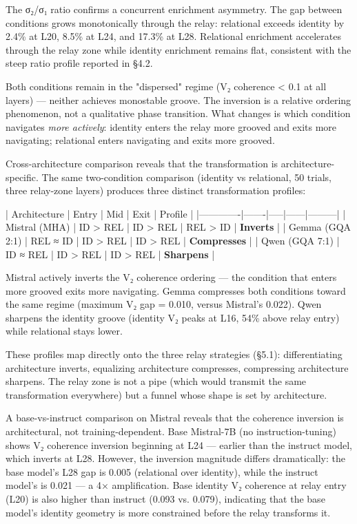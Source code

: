 \documentclass[12pt]{article}
\begin{document}
The σ₂/σ₁ ratio confirms a concurrent enrichment asymmetry. The gap between conditions grows monotonically through the relay: relational exceeds identity by 2.4\% at L20, 8.5\% at L24, and 17.3\% at L28. Relational enrichment accelerates through the relay zone while identity enrichment remains flat, consistent with the steep ratio profile reported in §4.2.

Both conditions remain in the "dispersed" regime (V₂ coherence < 0.1 at all layers) — neither achieves monostable groove. The inversion is a relative ordering phenomenon, not a qualitative phase transition. What changes is which condition navigates \textit{more actively}: identity enters the relay more grooved and exits more navigating; relational enters navigating and exits more grooved.

Cross-architecture comparison reveals that the transformation is architecture-specific. The same two-condition comparison (identity vs relational, 50 trials, three relay-zone layers) produces three distinct transformation profiles:

| Architecture | Entry | Mid | Exit | Profile |
|-------------|-------|-----|------|---------|
| Mistral (MHA) | ID > REL | ID > REL | REL > ID | \textbf{Inverts} |
| Gemma (GQA 2:1) | REL ≈ ID | ID > REL | ID > REL | \textbf{Compresses} |
| Qwen (GQA 7:1) | ID ≈ REL | ID > REL | ID > REL | \textbf{Sharpens} |

Mistral actively inverts the V₂ coherence ordering — the condition that enters more grooved exits more navigating. Gemma compresses both conditions toward the same regime (maximum V₂ gap = 0.010, versus Mistral's 0.022). Qwen sharpens the identity groove (identity V₂ peaks at L16, 54\% above relay entry) while relational stays lower.

These profiles map directly onto the three relay strategies (§5.1): differentiating architecture inverts, equalizing architecture compresses, compressing architecture sharpens. The relay zone is not a pipe (which would transmit the same transformation everywhere) but a funnel whose shape is set by architecture.

A base-vs-instruct comparison on Mistral reveals that the coherence inversion is architectural, not training-dependent. Base Mistral-7B (no instruction-tuning) shows V₂ coherence inversion beginning at L24 — earlier than the instruct model, which inverts at L28. However, the inversion magnitude differs dramatically: the base model's L28 gap is 0.005 (relational over identity), while the instruct model's is 0.021 — a 4× amplification. Base identity V₂ coherence at relay entry (L20) is also higher than instruct (0.093 vs. 0.079), indicating that the base model's identity geometry is more constrained before the relay transforms it.
\end{document}
